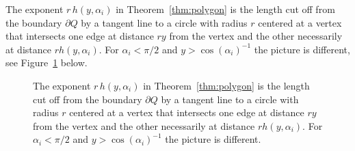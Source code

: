 \documentclass{article}
\begin{document}
The exponent $r \,h(y,\alpha_i)$ in Theorem~\ref{thm:polygon} is the length cut off from the boundary $\partial Q$ by a tangent line to a circle with radius $r$ centered at a vertex that intersects one edge at distance $ry$ from the vertex and the other necessarily at distance $r h(y,\alpha_i)$. For $\alpha_i<\pi/2$ and $y>\cos(\alpha_i)^{-1}$ the picture is different, see Figure~\ref{fig:small-alpha} below.

\begin{figure}[h]
    \centering
    \caption{The exponent $r \,h(y,\alpha_i)$ in Theorem~\ref{thm:polygon} is the length cut off from the boundary $\partial Q$ by a tangent line to a circle with radius $r$ centered at a vertex that intersects one edge at distance $ry$ from the vertex and the other necessarily at distance $r h(y,\alpha_i)$. For $\alpha_i<\pi/2$ and $y>\cos(\alpha_i)^{-1}$ the picture is different.}
    \label{fig:small-alpha}
\end{figure}
\end{document}
